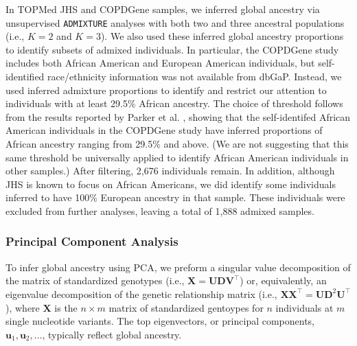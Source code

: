 \documentclass[12pt]{article}
\begin{document}
In TOPMed JHS and COPDGene samples, we inferred global ancestry via unsupervised \texttt{ADMIXTURE} analyses with both two and three ancestral populations (i.e., $K = 2$ and $K = 3$). 
We also used these inferred global ancestry proportions to identify subsets of admixed individuals.
In particular, the COPDGene study includes both African American and European American individuals, but  self-identified race/ethnicity information was not available from dbGaP.
Instead, we used inferred admixture proportions to identify and restrict our attention to individuals with at least 29.5\% African ancestry.
The choice of threshold follows from the results reported by Parker et al. \cite{parker2014}, showing that the self-identifed African American individuals in the COPDGene study have inferred proportions of African ancestry ranging from 29.5\% and above.
(We are not suggesting that this same threshold be universally applied to identify African American individuals in other samples.)
After filtering, 2,676 individuals remain. 
In addition, although JHS is known to focus on African Americans, we did identify some individuals inferred to have 100\% European ancestry in that sample.
These individuals were excluded from further analyses, leaving a total of 1,888 admixed samples. 


\subsubsection{Principal Component Analysis}

To infer global ancestry using PCA, we preform a singular value decomposition of the matrix of standardized genotypes (i.e., $\mathbf{X} = \mathbf{U}\mathbf{D}\mathbf{V}^\top$) or, equivalently, an eigenvalue decomposition of the genetic relationship matrix (i.e., $\mathbf{X}\mathbf{X}^\top = \mathbf{U}\mathbf{D}^2\mathbf{U}^\top$), where $\mathbf{X}$ is the $n \times m$ matrix of standardized gentoypes for $n$ individuals at $m$ single nucleotide variants.
The top eigenvectors, or principal components, $\mathbf{u}_1, \mathbf{u}_2, \dots$, typically reflect global ancestry.
\end{document}
